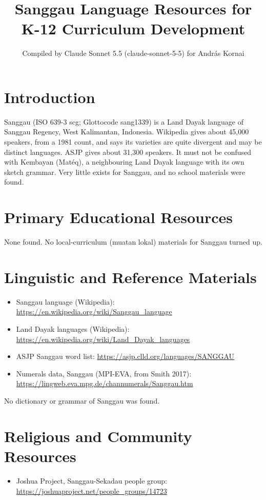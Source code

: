 \documentclass[12pt]{article}
\title{Sanggau Language Resources for K-12 Curriculum Development}
\author{Compiled by Claude Sonnet 5.5 (claude-sonnet-5-5) for Andr\'as Kornai}
\date{}
\begin{document}
\maketitle

\section{Introduction}
Sanggau (ISO 639-3 scg; Glottocode sang1339) is a Land Dayak language of Sanggau Regency, West Kalimantan, Indonesia. Wikipedia gives about 45,000 speakers, from a 1981 count, and says its varieties are quite divergent and may be distinct languages. ASJP gives about 31,300 speakers. It must not be confused with Kembayan (Matéq), a neighbouring Land Dayak language with its own sketch grammar. Very little exists for Sanggau, and no school materials were found.

\section{Primary Educational Resources}
None found. No local-curriculum (muatan lokal) materials for Sanggau turned up.

\section{Linguistic and Reference Materials}
\begin{itemize}
\item Sanggau language (Wikipedia): \url{https://en.wikipedia.org/wiki/Sanggau_language}
\item Land Dayak languages (Wikipedia): \url{https://en.wikipedia.org/wiki/Land_Dayak_languages}
\item ASJP Sanggau word list: \url{https://asjp.clld.org/languages/SANGGAU}
\item Numerals data, Sanggau (MPI-EVA, from Smith 2017): \url{https://lingweb.eva.mpg.de/channumerals/Sanggau.htm}
\end{itemize}
No dictionary or grammar of Sanggau was found.

\section{Religious and Community Resources}
\begin{itemize}
\item Joshua Project, Sanggau-Sekadau people group: \url{https://joshuaproject.net/people_groups/14723}
\end{itemize}
\end{document}
